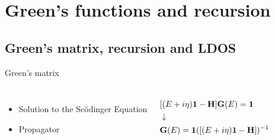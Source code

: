 \documentclass[hyperref={colorlinks=true,urlcolor=blue,linkcolor=.},aspectratio=1610,mathserif]{beamer}
\begin{document}
\section{Green's functions and recursion}
\subsection{Green's matrix, recursion and LDOS}

\begin{frame}{Green's matrix}
	\begin{center}
		\begin{columns}[c]
			\begin{itemize}
				\item Solution to the Sc\"{o}dinger Equation
				\item Propagator
			\end{itemize}
			\begin{align*}
				 & [(E+i\eta)\vb{1}-\vb{H}]\vb{G}(E)=\vb{1}        \\
				 & \downarrow                                      \\
				 & \vb{G}(E)=\vb{1}([(E+i\eta)\vb{1}-\vb{H}])^{-1}
			\end{align*}
		\end{columns}
	\end{center}
\end{frame}
\end{document}
